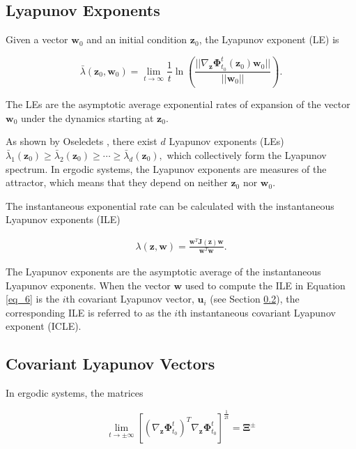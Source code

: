 \documentclass[aps,reprint,prx]{revtex4-2}
\begin{document}
\subsection{\label{sec:lyapunov_exponents}Lyapunov Exponents}
Given a vector $\mathbf{w}_0$ and an initial condition $\mathbf{z}_0$, the Lyapunov exponent (LE) is \cite{pikovskyLyapunovExponentsTool2016}

\begin{equation} \label{eq_4}
\bar\lambda(\mathbf{z}_0,\mathbf{w}_0) = \lim_{t \to \infty} \frac{1}{t} \ln\left(\frac{||\nabla_{\mathbf{z}}\mathbf{\Phi}_{t_0}^{t}(\mathbf{z}_0)\mathbf{w}_0||}{||\mathbf{w}_0||}\right).
\end{equation}

The LEs are the asymptotic average exponential rates of expansion of the vector $\mathbf{w}_0$ under the dynamics starting at $\mathbf{z}_0$.

As shown by Oseledets \cite{oseledets1968multiplicative}, there exist $d$ Lyapunov exponents (LEs)
$ \bar \lambda_1(\mathbf{z}_0) \ge \bar \lambda_2(\mathbf{z}_0) \ge \cdots \ge \bar \lambda_d(\mathbf{z}_0),
$ which collectively form the Lyapunov spectrum.
In ergodic systems, the Lyapunov exponents are measures of the attractor, which means that they depend on neither $\mathbf{z}_0$ nor $\mathbf{w}_0$.

The instantaneous exponential rate can be calculated with the instantaneous Lyapunov exponents (ILE) \cite{kuptsovLyapunovAnalysisStrange2018}

\begin{align} \label{eq_6}
\lambda(\mathbf{z},\mathbf{w}) = \frac{{\mathbf{w}^T\mathbf{J}(\mathbf{z})\mathbf{w}}}{{\mathbf{w}^T \mathbf{w}}}.
\end{align}

The Lyapunov exponents are the asymptotic average of the instantaneous Lyapunov exponents. When the vector $\mathbf{w}$ used to compute the ILE in Equation \eqref{eq_6} is the $i$th covariant Lyapunov vector, $\mathbf{u}_i$ (see Section \ref{sec:covariant_lyapunov_vectors}), the corresponding ILE is referred to as the $i$th instantaneous covariant Lyapunov exponent (ICLE).

\subsection{Covariant Lyapunov Vectors}\label{sec:covariant_lyapunov_vectors}
In ergodic systems, the matrices

\begin{equation}\label{eq_7}
\lim_{t \to \pm \infty} \left[\left(\nabla_{\mathbf{z}}\mathbf{\Phi}_{t_0}^{t}\right)^T \nabla_{\mathbf{z}}\mathbf{\Phi}_{t_0}^{t} \right]^{\frac{1}{2t}} = \mathbf{\Xi}^\pm
\end{equation}
\end{document}
